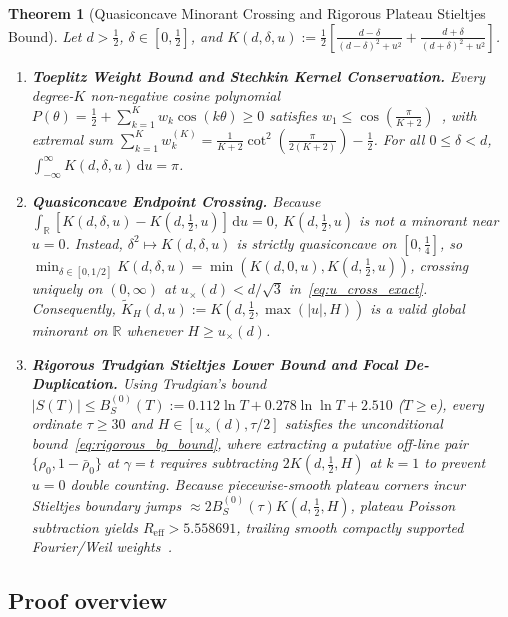 \documentclass[11pt,reqno]{amsart}
\newtheorem{theorem}{Theorem}[section]
\theoremstyle{definition}
\theoremstyle{remark}
\numberwithin{equation}{section}
\newcommand{\R}{\mathbb{R}}
\newcommand{\dd}{\mathrm{d}}
\newcommand{\ee}{\mathrm{e}}
\begin{document}
\begin{theorem}[Quasiconcave Minorant Crossing and Rigorous Plateau Stieltjes Bound]\label{thm:main_p7}
Let $d > \frac{1}{2}$, $\delta \in [0, \frac{1}{2}]$, and $K(d, \delta, u) := \frac{1}{2}[\frac{d-\delta}{(d-\delta)^2+u^2} + \frac{d+\delta}{(d+\delta)^2+u^2}]$.
\begin{enumerate}[label=\textup{(\roman*)},leftmargin=2.2em]
\item \textbf{Toeplitz Weight Bound and Stechkin Kernel Conservation.} Every degree-$K$ non-negative cosine polynomial $P(\theta) = \frac{1}{2} + \sum_{k=1}^K w_k\cos(k\theta) \ge 0$ satisfies $w_1 \le \cos(\frac{\pi}{K+2})$~\cite{fejer1916,szego1975}, with extremal sum $\sum_{k=1}^K w_k^{(K)} = \frac{1}{K+2}\cot^2(\frac{\pi}{2(K+2)}) - \frac{1}{2}$. For all $0 \le \delta < d$, $\int_{-\infty}^{\infty} K(d, \delta, u)\,\dd u = \pi$.
\item \textbf{Quasiconcave Endpoint Crossing.} Because $\int_{\R}[K(d,\delta,u) - K(d,\frac{1}{2},u)]\,\dd u = 0$, $K(d, \frac{1}{2}, u)$ is \emph{not} a minorant near $u = 0$. Instead, $\delta^2 \mapsto K(d, \delta, u)$ is strictly quasiconcave on $[0, \frac{1}{4}]$, so $\min_{\delta \in [0,1/2]} K(d, \delta, u) = \min(K(d,0,u), K(d,\frac{1}{2},u))$, crossing uniquely on $(0,\infty)$ at $u_{\times}(d) < d/\sqrt{3}$ in~\eqref{eq:u_cross_exact}. Consequently, $\widetilde{K}_H(d,u) := K(d, \frac{1}{2}, \max(\lvert u\rvert, H))$ is a valid global minorant on $\R$ whenever $H \ge u_{\times}(d)$.
\item \textbf{Rigorous Trudgian Stieltjes Lower Bound and Focal De-Duplication.} Using Trudgian's bound~\cite{trudgian2014} $\lvert S(T)\rvert \le B_S^{(0)}(T) := 0.112\ln T + 0.278\ln\ln T + 2.510$ ($T \ge \ee$), every ordinate $\tau \ge 30$ and $H \in [u_{\times}(d), \tau/2]$ satisfies the unconditional bound~\eqref{eq:rigorous_bg_bound}, where extracting a putative off-line pair $\{\rho_0, 1-\bar{\rho}_0\}$ at $\gamma = t$ requires subtracting $2K(d, \frac{1}{2}, H)$ at $k = 1$ to prevent $u = 0$ double counting. Because piecewise-smooth plateau corners incur Stieltjes boundary jumps $\approx 2B_S^{(0)}(\tau)K(d,\frac{1}{2},H)$, plateau Poisson subtraction yields $R_{\mathrm{eff}} > 5.558691$, trailing smooth compactly supported Fourier/Weil weights~\cite{heathbrown1992,mty2024}.
\end{enumerate}
\end{theorem}

\subsection{Proof overview}\label{subsec:proof_overview}
\end{document}
